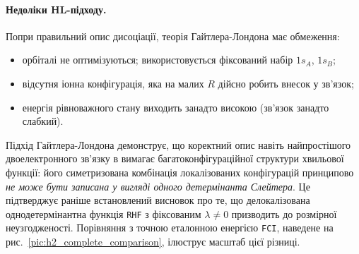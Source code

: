 \paragraph{Недоліки HL-підходу.}

Попри правильний опис дисоціації, теорія Гайтлера-Лондона має обмеження:
\begin{itemize}
	\item орбіталі не оптимізуються; використовується фіксований набір $1s_A$, $1s_B$;
	\item відсутня іонна конфігурація, яка на малих $R$
	      дійсно робить внесок у зв'язок;
	\item енергія рівноважного стану виходить занадто високою (зв'язок занадто слабкий).
\end{itemize}

Підхід Гайтлера-Лондона демонструє, що коректний опис навіть
найпростішого двоелектронного зв'язку в  вимагає
багатоконфігураційної структури хвильової функції: його симетризована
комбінація локалізованих конфігурацій принципово \emph{не може бути
	записана у вигляді одного детермінанта Слейтера}. Це підтверджує
раніше встановлений висновок про те, що делокалізована
однодетермінантна функція \texttt{RHF} з фіксованим $\lambda\neq 0$
призводить до розмірної неузгодженості. Порівняння з точною
еталонною енергією \texttt{FCI}, наведене на
рис.~\ref{pic:h2_complete_comparison}, ілюструє масштаб цієї різниці.

